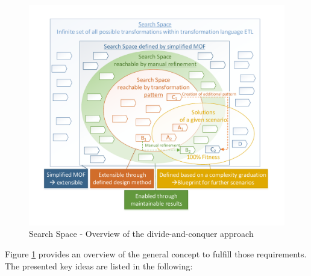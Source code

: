\begin{figure}[ht!]
	\centering
	\includegraphics[scale=0.7, trim=0cm 1cm 0cm 1cm, clip=true]{Images/SearchSpaceDivideAndConquer.pdf} 
	\caption{Search Space - Overview of the divide-and-conquer approach}
	\label{figSearchSpaceDivideAndConquer}
\end{figure}

Figure \ref{figSearchSpaceDivideAndConquer} provides an overview of the general concept to fulfill those requirements. The presented key ideas are listed in the following: %

